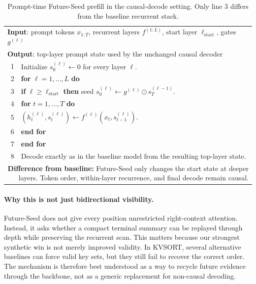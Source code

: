 \documentclass{article}
\begin{document}
\begin{table}[t]
\centering
\small
\caption{Prompt-time Future-Seed prefill in the causal-decode setting. Only line 3 differs from the baseline recurrent stack.}
\label{tab:future-seed-algorithm}
\begin{tabular}{r p{}}
\toprule
\multicolumn{2}{l}{\textbf{Input}: prompt tokens $x_{1:T}$, recurrent layers $f^{(1:L)}$, start layer $\ell_{\mathrm{start}}$, gates $g^{(\ell)}$} \\
\multicolumn{2}{l}{\textbf{Output}: top-layer prompt state used by the unchanged causal decoder} \\
\midrule
1 & Initialize $s_0^{(\ell)} \leftarrow 0$ for every layer $\ell$. \\
2 & \textbf{for} $\ell = 1, \ldots, L$ \textbf{do} \\
3 & \quad \textbf{if} $\ell \ge \ell_{\mathrm{start}}$ \textbf{then} seed $s_0^{(\ell)} \leftarrow g^{(\ell)} \odot s_T^{(\ell-1)}$. \\
4 & \quad \textbf{for} $t = 1, \ldots, T$ \textbf{do} \\
5 & \qquad $(h_t^{(\ell)}, s_t^{(\ell)}) \leftarrow f^{(\ell)}(x_t, s_{t-1}^{(\ell)})$. \\
6 & \quad \textbf{end for} \\
7 & \textbf{end for} \\
8 & Decode exactly as in the baseline model from the resulting top-layer state. \\
\midrule
\multicolumn{2}{p{0.95\columnwidth}}{\textbf{Difference from baseline:} Future-Seed only changes the start state at deeper layers. Token order, within-layer recurrence, and final decode remain causal.} \\
\bottomrule
\end{tabular}
\end{table}

\paragraph{Why this is not just bidirectional visibility.}
Future-Seed does not give every position unrestricted right-context attention. Instead, it asks whether a compact terminal summary can be replayed through depth while preserving the recurrent scan. This matters because our strongest synthetic win is not merely improved validity. In KVSORT, several alternative baselines can force valid key sets, but they still fail to recover the correct order. The mechanism is therefore best understood as a way to recycle future evidence through the backbone, not as a generic replacement for non-causal decoding.
\end{document}
